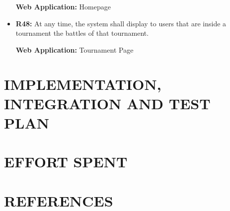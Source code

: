 \documentclass{article}
\begin{document}
\begin{itemize}
    \textbf{Web Application:} Homepage

    \item \textbf{R48:} At any time, the system shall display to users that are inside a tournament the battles of that tournament.
    
    \textbf{Web Application:} Tournament Page


\end{itemize}


\section{IMPLEMENTATION, INTEGRATION AND TEST PLAN}



\section{EFFORT SPENT}

\section{REFERENCES}
\end{document}
